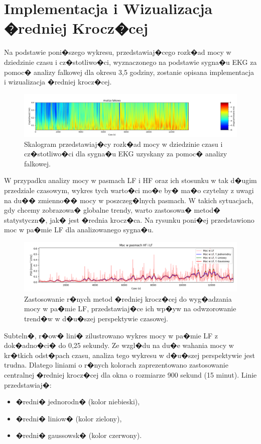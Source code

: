 \section{Implementacja i Wizualizacja �redniej Krocz�cej}

Na podstawie poni�szego wykresu, przedstawiaj�cego rozk�ad mocy w dziedzinie
czasu i cz�stotliwo�ci, wyznaczonego na podstawie sygna�u EKG za pomoc� analizy
falkowej dla okresu 3,5 godziny, zostanie opisana implementacja i wizualizacja
�redniej krocz�cej.

\begin{figure}
    \centering
    \includegraphics[scale=0.4]{Rysunki/wavePORANEK.png}
    \caption{Skalogram przedstawiaj�cy rozk�ad mocy w dziedzinie czasu i cz�stotliwo�ci dla sygna�u EKG uzyskany za pomoc� analizy falkowej.}
    \label{fig:wavePORANEK}
\end{figure}

W przypadku analizy mocy w pasmach LF i HF oraz ich stosunku w tak d�ugim
przedziale czasowym, wykres tych warto�ci mo�e by� ma�o czytelny z uwagi na
du�� zmienno�� mocy w poszczeg�lnych pasmach. W takich sytuacjach, gdy chcemy
zobrazowa� globalne trendy, warto zastosowa� metod� statystyczn�, jak� jest
�rednia krocz�ca. Na rysunku poni�ej przedstawiono moc w pa�mie LF dla
analizowanego sygna�u.

\begin{figure}
    \centering
    \includegraphics[scale=0.4]{Rysunki/lf_avg.png}
    \caption{Zastosowanie r�nych metod �redniej krocz�cej do wyg�adzania mocy w pa�mie LF, przedstawiaj�ce ich wp�yw na odwzorowanie trend�w w d�u�szej perspektywie czasowej.}
    \label{fig:lf_avg}
\end{figure}

Subteln�, r�ow� lini� zilustrowano wykres mocy w pa�mie LF z dok�adno�ci� do
0,25 sekundy. Ze wzgl�du na du�e wahania mocy w kr�tkich odst�pach czasu,
analiza tego wykresu w d�u�szej perspektywie jest trudna. Dlatego liniami o
r�nych kolorach zaprezentowano zastosowanie centralnej �redniej krocz�cej dla
okna o rozmiarze 900 sekund (15 minut). Linie przedstawiaj�:
\begin{itemize}
    \item �redni� jednorodn� (kolor niebieski),
    \item �redni� liniow� (kolor zielony),
    \item �redni� gaussowsk� (kolor czerwony).
\end{itemize}

